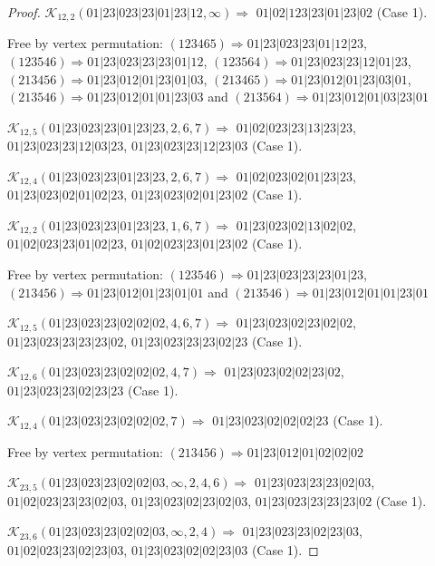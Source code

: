\documentclass[12pt]{article}
\theoremstyle{plain}
\theoremstyle{definition}
\theoremstyle{remark}
\newcommand{\fancy}[1]{\mathcal{#1}}
\def\K{\fancy{K}}
\begin{document}
\begin{proof}
	$\K_{12,2}(01|23|023|23|01|23|12,\infty)\Rightarrow $ $01|02|123|23|01|23|02$ (Case 1).
	
	
	
	Free by vertex permutation: $(1 2 3 4 6 5)\Rightarrow 01|23|023|23|01|12|23$, $(1 2 3 5 4 6)\Rightarrow 01|23|023|23|23|01|12$, $(1 2 3 5 6 4)\Rightarrow 01|23|023|23|12|01|23$, $(2 1 3 4 5 6)\Rightarrow 01|23|012|01|23|01|03$, $(2 1 3 4 6 5)\Rightarrow 01|23|012|01|23|03|01$, $(2 1 3 5 4 6)\Rightarrow 01|23|012|01|01|23|03$ and $(2 1 3 5 6 4)\Rightarrow 01|23|012|01|03|23|01$
	
	
	
	\bigskip
	
	$\K_{12,5}(01|23|023|23|01|23|23,2, 6, 7)\Rightarrow $ $01|02|023|23|13|23|23$, $01|23|023|23|12|03|23$, $01|23|023|23|12|23|03$ (Case 1).
	
	$\K_{12,4}(01|23|023|23|01|23|23,2, 6, 7)\Rightarrow $ $01|02|023|02|01|23|23$, $01|23|023|02|01|02|23$, $01|23|023|02|01|23|02$ (Case 1).
	
	$\K_{12,2}(01|23|023|23|01|23|23,1, 6, 7)\Rightarrow $ $01|23|023|02|13|02|02$, $01|02|023|23|01|02|23$, $01|02|023|23|01|23|02$ (Case 1).
	
	
	
	Free by vertex permutation: $(1 2 3 5 4 6)\Rightarrow 01|23|023|23|23|01|23$, $(2 1 3 4 5 6)\Rightarrow 01|23|012|01|23|01|01$ and $(2 1 3 5 4 6)\Rightarrow 01|23|012|01|01|23|01$
	
	
	
	\bigskip
	
	$\K_{12,5}(01|23|023|23|02|02|02,4, 6, 7)\Rightarrow $ $01|23|023|02|23|02|02$, $01|23|023|23|23|23|02$, $01|23|023|23|23|02|23$ (Case 1).
	
	$\K_{12,6}(01|23|023|23|02|02|02,4, 7)\Rightarrow $ $01|23|023|02|02|23|02$, $01|23|023|23|02|23|23$ (Case 1).
	
	$\K_{12,4}(01|23|023|23|02|02|02,7)\Rightarrow $ $01|23|023|02|02|02|23$ (Case 1).
	
	
	
	Free by vertex permutation: $(2 1 3 4 5 6)\Rightarrow 01|23|012|01|02|02|02$
	
	
	
	\bigskip
	
	$\K_{23,5}(01|23|023|23|02|02|03,\infty,2, 4, 6)\Rightarrow $ $01|23|023|23|23|02|03$, $01|02|023|23|23|02|03$, $01|23|023|02|23|02|03$, $01|23|023|23|23|23|02$ (Case 1).
	
	$\K_{23,6}(01|23|023|23|02|02|03,\infty,2, 4)\Rightarrow $ $01|23|023|23|02|23|03$, $01|02|023|23|02|23|03$, $01|23|023|02|02|23|03$ (Case 1).
	

\end{proof}
\end{document}
